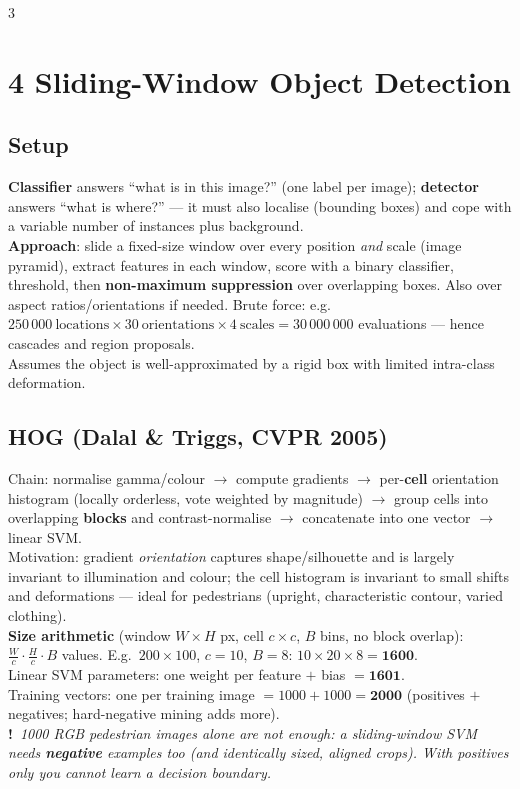 \documentclass[9pt,a4paper,landscape]{extarticle}
\newcommand{\key}[1]{\textbf{#1}}
\newcommand{\tr}[1]{{\color{trap}\textbf{!}}\ \textit{#1}}
\begin{document}
\begin{multicols}{3}
\section{4 \; Sliding-Window Object Detection}

\subsection{Setup}
\key{Classifier} answers ``what is in this image?'' (one label per image); \key{detector} answers ``what is where?'' --- it must also localise (bounding boxes) and cope with a variable number of instances plus background.\\
\key{Approach}: slide a fixed-size window over every position \emph{and} scale (image pyramid), extract features in each window, score with a binary classifier, threshold, then \key{non-maximum suppression} over overlapping boxes. Also over aspect ratios/orientations if needed. Brute force: e.g.\ $250\,000\ \text{locations}\times30\ \text{orientations}\times4\ \text{scales}=30\,000\,000$ evaluations --- hence cascades and region proposals.\\
Assumes the object is well-approximated by a rigid box with limited intra-class deformation.

\subsection{HOG (Dalal \& Triggs, CVPR 2005)}
Chain: normalise gamma/colour $\to$ compute gradients $\to$ per-\key{cell} orientation histogram (locally orderless, vote weighted by magnitude) $\to$ group cells into overlapping \key{blocks} and contrast-normalise $\to$ concatenate into one vector $\to$ linear SVM.\\
Motivation: gradient \emph{orientation} captures shape/silhouette and is largely invariant to illumination and colour; the cell histogram is invariant to small shifts and deformations --- ideal for pedestrians (upright, characteristic contour, varied clothing).\\
\key{Size arithmetic} (window $W\times H$ px, cell $c\times c$, $B$ bins, no block overlap): $\frac{W}{c}\cdot\frac{H}{c}\cdot B$ values. E.g.\ $200\times100$, $c=10$, $B=8$: $10\times20\times8=\mathbf{1600}$.\\
Linear SVM parameters: one weight per feature $+$ bias $=\mathbf{1601}$.\\
Training vectors: one per training image $=1000+1000=\mathbf{2000}$ (positives $+$ negatives; hard-negative mining adds more).\\
\tr{1000 RGB pedestrian images \emph{alone} are not enough: a sliding-window SVM needs \key{negative} examples too (and identically sized, aligned crops). With positives only you cannot learn a decision boundary.}


\end{multicols}
\end{document}
